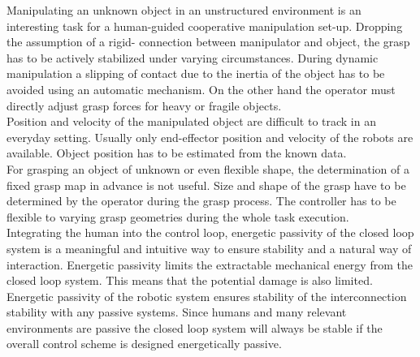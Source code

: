 \documentclass[a4paper,twoside, openright,12pt]{report}
\begin{document}

Manipulating an unknown object in an unstructured environment is an interesting task for a human-guided cooperative manipulation set-up. Dropping the assumption of a rigid- connection between manipulator and object, the grasp has to be actively stabilized under varying circumstances. During dynamic manipulation a slipping of contact due to the inertia of the object has to be avoided using an automatic mechanism. On the other hand the operator must directly adjust grasp forces for heavy or fragile objects.\\
Position and velocity of the manipulated object are difficult to track in an everyday setting. Usually only end-effector position and velocity of the robots are available. Object position has to be estimated from the known data.\\
For grasping an  object of unknown or even flexible shape, the determination of a fixed grasp map in advance is not useful. Size and shape of the grasp have to be determined by the operator during the grasp process. The controller has to be flexible to varying grasp geometries during the whole task execution.\\
Integrating the human into the control loop, energetic passivity of the closed loop system is a meaningful and intuitive way to ensure stability and a natural way of interaction. Energetic passivity limits the extractable mechanical energy from the closed loop system. This means that the potential damage is also limited. 
Energetic passivity of the robotic system ensures stability of the interconnection stability with any passive systems. Since humans and many relevant environments are passive the closed loop system will always be stable if the overall control scheme is designed energetically passive.
\end{document}
